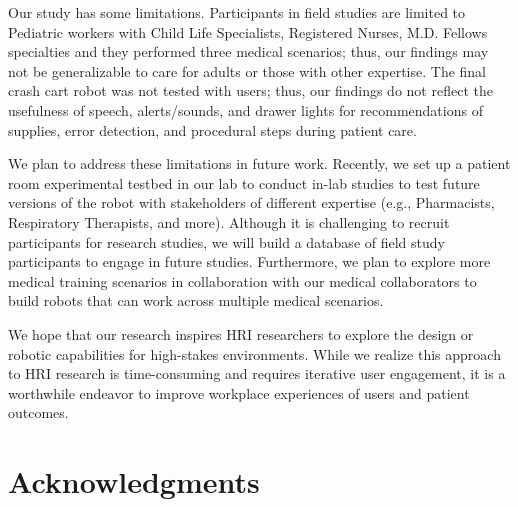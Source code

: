 Our study has some limitations.
Participants in field studies are limited to Pediatric workers with Child Life Specialists, Registered Nurses, M.D. Fellows specialties and they performed three medical scenarios; thus, our findings may not be generalizable to care for adults or those with other expertise.
The final crash cart robot was not tested with users; thus, our findings do not reflect the usefulness of speech, alerts/sounds, and drawer lights for recommendations of supplies, error detection, and procedural steps during patient care.

We plan to address these limitations in future work.
Recently, we set up a patient room experimental testbed in our lab to conduct in-lab studies to test future versions of the robot with stakeholders of different expertise (e.g., Pharmacists, Respiratory Therapists, and more).
Although it is challenging to recruit participants for research studies, we will build a database of field study participants to engage in future studies.
Furthermore, we plan to explore more medical training scenarios in collaboration with our medical collaborators to build robots that can work across multiple medical scenarios.

We hope that our research inspires HRI researchers to explore the design or robotic capabilities for high-stakes environments. 
While we realize this approach to HRI research is time-consuming and requires iterative user engagement, it is a worthwhile endeavor to improve workplace experiences of users and patient outcomes.

\section{Acknowledgments}

